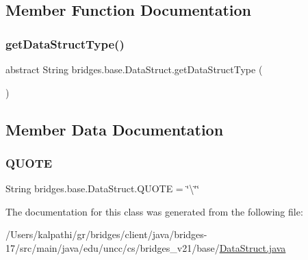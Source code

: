 \subsection{Member Function Documentation}
\mbox{\label{classbridges_1_1base_1_1_data_struct_a3bae9d0d68a85e517a34be482e90fdd4}} 
\subsubsection{\texorpdfstring{get\+Data\+Struct\+Type()}{getDataStructType()}}
{\footnotesize\ttfamily abstract String bridges.\+base.\+Data\+Struct.\+get\+Data\+Struct\+Type (\begin{DoxyParamCaption}{ }\end{DoxyParamCaption})\hspace{0.3cm}{\ttfamily [abstract]}}



\subsection{Member Data Documentation}
\mbox{\label{classbridges_1_1base_1_1_data_struct_aac4a6ea28f44676274120ba1dddafc1f}} 
\subsubsection{\texorpdfstring{Q\+U\+O\+TE}{QUOTE}}
{\footnotesize\ttfamily String bridges.\+base.\+Data\+Struct.\+Q\+U\+O\+TE = \char`\"{}\textbackslash{}\char`\"{}\char`\"{}\hspace{0.3cm}{\ttfamily [protected]}}



The documentation for this class was generated from the following file\+:\begin{DoxyCompactItemize}
\item 
/\+Users/kalpathi/gr/bridges/client/java/bridges-\/17/src/main/java/edu/uncc/cs/bridges\+\_\+v21/base/\mbox{\hyperlink{_data_struct_8java}{Data\+Struct.\+java}}\end{DoxyCompactItemize}
